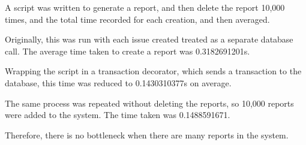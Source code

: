 A script was written to generate a report, and then delete the report 10,000 times, and the total time recorded for each creation, and then averaged.

Originally, this was run with each issue created treated as a separate database call. The average time taken to create a report was 0.3182691201s.

Wrapping the script in a transaction decorator, which sends a transaction to the database, this time was reduced to 0.1430310377s on average.

The same process was repeated without deleting the reports, so 10,000 reports were added to the system. The time taken was 0.1488591671.

Therefore, there is no bottleneck when there are many reports in the system.